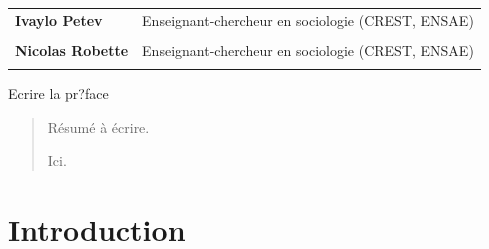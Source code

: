 \documentclass[12pt,a4paper]{reedthesis}
\begin{document}
\begin{titlepage}
\scriptsize
{}
\begin{tabular}{|p{4cm}l}
\textbf{Ivaylo Petev} &  Enseignant-chercheur en sociologie (CREST, ENSAE)\\
 & \\
\textbf{Nicolas Robette} &  Enseignant-chercheur en sociologie (CREST, ENSAE)\\
 & \\
\end{tabular}

\end{titlepage}
\addamargin %

\frontmatter %
\pagestyle{empty} %
  \begin{acknowledgements}
    Ecrire la pr?face
  \end{acknowledgements}
  \begin{abstract}
    Résumé à écrire.

    \par

    Ici.
  \end{abstract}
% 
  \hypersetup{linkcolor=black}
  \setcounter{secnumdepth}{2}
  \setcounter{tocdepth}{2}
  \tableofcontents




\mainmatter %
\pagestyle{fancyplain} %

\hypertarget{introduction}{%
\chapter*{Introduction}\label{introduction}}
\end{document}
